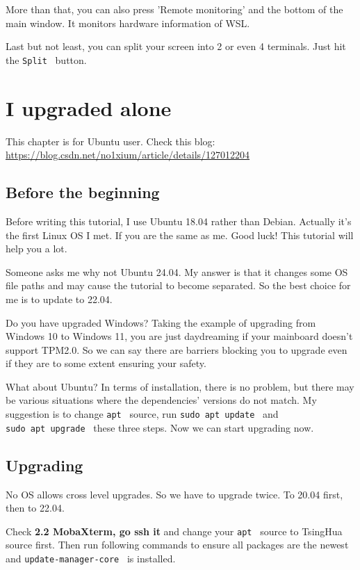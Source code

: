 \documentclass[lang=en,color=blue,12pt]{elegantbook}
\let\oldtexttt\texttt
\renewcommand{\texttt}[1]{%
  \begingroup
  \setlength{\fboxsep}{1pt}%
  \colorbox{gray!10}{\oldtexttt{#1}}%
  \endgroup
}
\begin{document}
More than that, you can also press 'Remote
monitoring' and the bottom of the main window. It
monitors hardware information of WSL.

Last but not least, you can split your screen into 2 or even 4
terminals. Just hit the \texttt{Split}\ button.

\section{\textbf{I upgraded alone}}

\begin{note}
This chapter is for Ubuntu user. Check this blog:
\url{https://blog.csdn.net/no1xium/article/details/127012204}
\end{note}

\subsection{\textbf{Before the beginning}}

Before writing this tutorial, I use Ubuntu 18.04 rather than Debian.
Actually it's the first Linux OS I met. If you are the
same as me. Good luck! This tutorial will help you a lot.

Someone asks me why not Ubuntu 24.04. My answer is that it changes some
OS file paths and may cause the tutorial to become separated. So the
best choice for me is to update to 22.04.

Do you have upgraded Windows? Taking the example of upgrading from
Windows 10 to Windows 11, you are just daydreaming if your mainboard
doesn't support TPM2.0. So we can say there are barriers
blocking you to upgrade even if they are to some extent ensuring your
safety.

What about Ubuntu? In terms of installation, there is no problem, but
there may be various situations where the dependencies'
versions do not match. My suggestion is to change \texttt{apt}\ source,
run \texttt{sudo\ apt\ update}\ and \texttt{sudo\ apt\ upgrade}\ these
three steps. Now we can start upgrading now.

\subsection{\textbf{Upgrading}}

No OS allows cross level upgrades. So we have to upgrade twice. To 20.04
first, then to 22.04.

Check \textbf{2.2 MobaXterm, go ssh it} and change your \texttt{apt}\
source to TsingHua source first. Then run following commands to ensure
all packages are the newest and \texttt{update-manager-core}\ is
installed.
\end{document}

